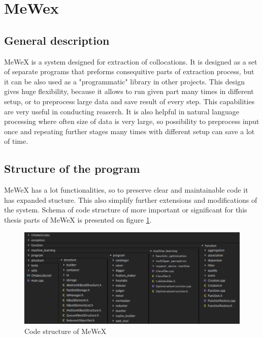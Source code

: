 \section{MeWex}

\subsection{General description}
MeWeX is a system designed for extraction of collocations. It is designed as a set of separate programs 
that preforms consequitive parts of extraction process, but it can be also used as a "programmatic" library in other projects. 
This design gives huge flexibility, because it allows to run given part many times in different setup, 
or to preprocess large data and save result of every step. This capabilities are very useful in conducting reaserch. 
It is also helpful in natural language processing where often size of data is very large, so possibility 
to preprocess input once and repeating further stages many times with different setup can save a lot of time.

\subsection{Structure of the program}
MeWeX has a lot functionalities, so to preserve clear and maintainable code it has expanded stucture. 
This also simplify further extensions and modifications of the system. Schema of code structure of more important 
or significant for this thesis parts of MeWeX is presented on figure \ref{img_structure}.

\begin{figure}[ht]
	\centering
	\includegraphics[scale=0.5]{img/mewex_structure.png}
	\caption{Code structure of MeWeX}
	\label{img_structure}
\end{figure}

